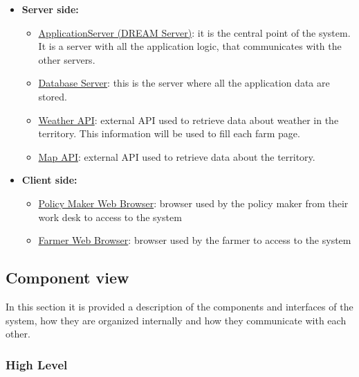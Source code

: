 \begin{itemize}
    \item \textbf{Server side:}
        \begin{itemize}
            \item \underline{ApplicationServer (DREAM Server)}: it is the central point of the system. It is a server with all the application logic, that communicates with the other servers. 
            \item \underline{Database Server}: this is the server where all the application data are stored.
            \item \underline{Weather API}: external API used to retrieve data about weather in the territory. This information will be used to fill each farm page.
            \item \underline{Map API}: external API used to retrieve data about the territory.
        \end{itemize}
    \item \textbf{Client side:}
        \begin{itemize}
            \item \underline{Policy Maker Web Browser}: browser used by the policy maker from their work desk to access to the system
            \item \underline{Farmer Web Browser}: browser used by the farmer to access to the system
        \end{itemize}
\end{itemize}


\subsection{Component view}

In this section it is provided a description of the components and interfaces of the system, how they are organized internally and how they communicate with each other.

\subsubsection{High Level}

